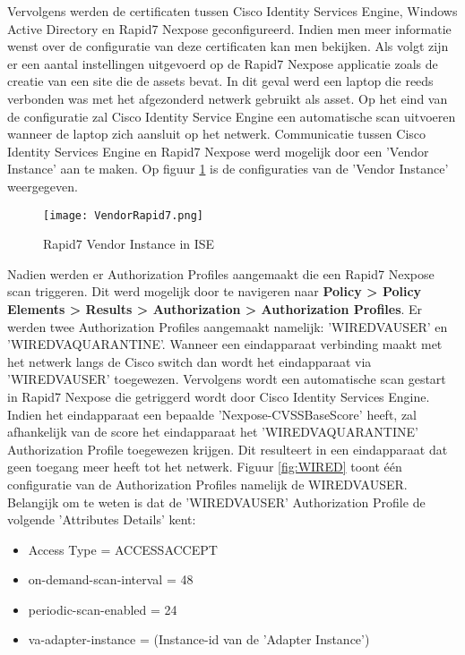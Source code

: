  Vervolgens werden de certificaten tussen Cisco Identity Services Engine, Windows Active Directory en Rapid7 Nexpose geconfigureerd. Indien men meer informatie wenst over de configuratie van deze certificaten kan men \cite{thread_yt} bekijken.
 \newline
 \newline
 Als volgt zijn er een aantal instellingen uitgevoerd op de Rapid7 Nexpose applicatie zoals de creatie van een site die de assets bevat. In dit geval werd een laptop die reeds verbonden was met het afgezonderd netwerk gebruikt als asset. Op het eind van de configuratie zal Cisco Identity Service Engine een automatische scan uitvoeren wanneer de laptop zich aansluit op het netwerk. 
 \newline
 \newline
 Communicatie tussen Cisco Identity Services Engine en Rapid7 Nexpose werd mogelijk door een 'Vendor Instance' aan te maken. Op figuur \ref{fig:vendor} is de configuraties van de 'Vendor Instance' weergegeven.
	 \begin{figure}[H]
		 	\centering
		 	\texttt{[image: VendorRapid7.png]}
		 	\caption{Rapid7 Vendor Instance in ISE}%
		 	\label{fig:vendor}%
	 \end{figure}
Nadien werden er Authorization Profiles aangemaakt die een Rapid7 Nexpose scan triggeren. Dit werd mogelijk door te navigeren naar \textbf{ Policy > Policy Elements > Results > Authorization > Authorization Profiles}. Er werden twee Authorization Profiles aangemaakt namelijk: 'WIRED\textunderscore VA\textunderscore USER' en 'WIRED\textunderscore VA\textunderscore QUARANTINE'. 
 \newline
\newline
Wanneer een eindapparaat verbinding maakt met het netwerk langs de Cisco switch dan wordt het eindapparaat via 'WIRED\textunderscore VA\textunderscore USER' toegewezen. Vervolgens wordt een automatische scan gestart in Rapid7 Nexpose die getriggerd wordt door Cisco Identity Services Engine. 
 \newline
\newline
Indien het eindapparaat een bepaalde 'Nexpose-CVSS\textunderscore Base\textunderscore Score' heeft, zal afhankelijk van de score het eindapparaat het 'WIRED\textunderscore VA\textunderscore QUARANTINE' Authorization Profile toegewezen krijgen. Dit resulteert in een eindapparaat dat geen toegang meer heeft tot het netwerk. Figuur \ref{fig:WIRED} toont één configuratie van de Authorization Profiles namelijk de WIRED\textunderscore VA\textunderscore USER. 
\newline
\newline
Belangijk om te weten is dat de 'WIRED\textunderscore VA\textunderscore USER' Authorization Profile de volgende 'Attributes Details' kent: 
	\begin{itemize}
	\item Access Type = ACCESS\textunderscore ACCEPT
	\item on-demand-scan-interval = 48
	\item periodic-scan-enabled = 24	
	\item va-adapter-instance = (Instance-id van de 'Adapter Instance')
\end{itemize}

